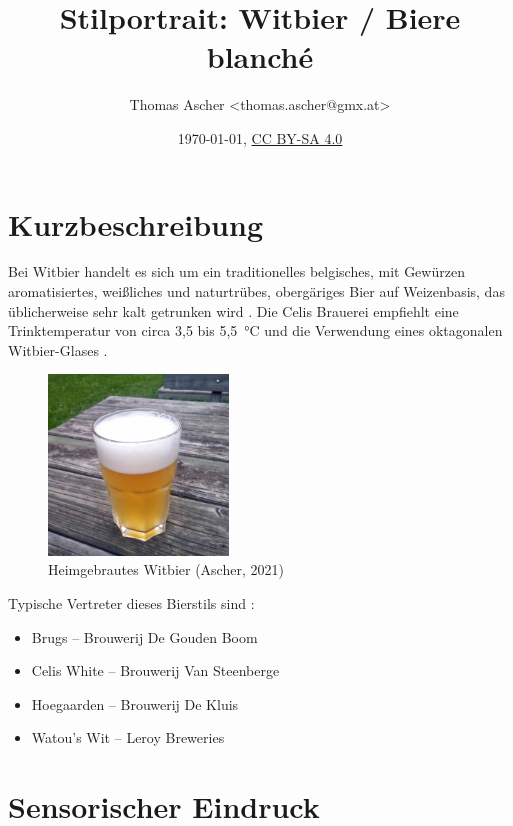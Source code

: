 \documentclass[a4paper,parskip=half]{scrartcl}
\title{Stilportrait: Witbier / Biere blanché}
\author{Thomas Ascher <thomas.ascher@gmx.at>}
\date{\today, \href{http://creativecommons.org/licenses/by-sa/4.0/}{CC BY-SA 4.0}}
\begin{document}
\maketitle

\section*{Kurzbeschreibung}

Bei Witbier handelt es sich um ein traditionelles belgisches, mit Gewürzen
aromatisiertes, weißliches und naturtrübes, obergäriges Bier auf Weizenbasis, das
üblicherweise sehr kalt getrunken wird \parencite[1\psq]{Strottner1999}.
Die Celis Brauerei empfiehlt eine Trinktemperatur von circa 3,5 bis 5,5~°C
und die Verwendung eines oktagonalen Witbier-Glases \parencite{CelisBrewery2021}.

\begin{multicols}{2}
\begin{figure}[H]
\centering
\includegraphics[width=4.8cm]{images/witbier.jpg}
\caption{Heimgebrautes Witbier (Ascher, 2021)}
\label{fig:witbier}
\end{figure}

\vfill\null
\columnbreak

Typische Vertreter dieses Bierstils sind \parencite[96-121]{Roncoroni2018}:

\begin{itemize}
\item Brugs – Brouwerij De Gouden Boom
\item Celis White – Brouwerij Van Steenberge
\item Hoegaarden – Brouwerij De Kluis
\item Watou's Wit – Leroy Breweries
\end{itemize}

\vfill\null
\end{multicols}

\vspace{-1.5cm}

\section*{Sensorischer Eindruck}
\end{document}
